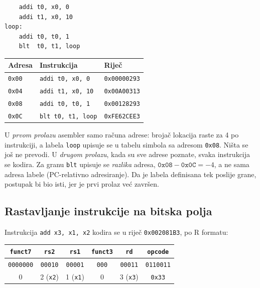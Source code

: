\documentclass[11pt,a4paper]{article}
\newcommand{\kod}[1]{\texttt{#1}}
\begin{document}
\begin{center}
\begin{minipage}[t]{0.3\textwidth}
\small
\begin{verbatim}
    addi t0, x0, 0
    addi t1, x0, 10
loop:
    addi t0, t0, 1
    blt  t0, t1, loop
\end{verbatim}
\end{minipage}%
\hfill
\begin{minipage}[t]{0.66\textwidth}
\small
\begin{tabular}{@{}lll@{}}
  \toprule
  \textbf{Adresa} & \textbf{Instrukcija} & \textbf{Riječ} \\
  \midrule
  \kod{0x00} & \kod{addi t0, x0, 0}   & \kod{0x00000293} \\
  \kod{0x04} & \kod{addi t1, x0, 10}  & \kod{0x00A00313} \\
  \kod{0x08} & \kod{addi t0, t0, 1}   & \kod{0x00128293} \\
  \kod{0x0C} & \kod{blt t0, t1, loop} & \kod{0xFE62CEE3} \\
  \bottomrule
\end{tabular}
\end{minipage}
\end{center}

U \emph{prvom prolazu} asembler samo računa adrese: brojač lokacija raste za 4 po instrukciji, a
labela \kod{loop} upisuje se u tabelu simbola sa adresom \kod{0x08}. Ništa se još ne prevodi.
U \emph{drugom prolazu}, kada su sve adrese poznate, svaka instrukcija se kodira. Za granu
\kod{blt} upisuje se \emph{razlika} adresa, $\kod{0x08} - \kod{0x0C} = -4$, a ne sama adresa
labele (PC-relativno adresiranje). Da je labela definisana tek poslije grane, postupak bi bio isti,
jer je prvi prolaz već završen.

\subsection{Rastavljanje instrukcije na bitska polja}

Instrukcija \kod{add x3, x1, x2} kodira se u riječ \kod{0x002081B3}, po R formatu:

\begin{center}
\small
\begin{tabular}{@{}cccccc@{}}
  \toprule
  \kod{funct7} & \kod{rs2} & \kod{rs1} & \kod{funct3} & \kod{rd} & \kod{opcode} \\
  \midrule
  \kod{0000000} & \kod{00010} & \kod{00001} & \kod{000} & \kod{00011} & \kod{0110011} \\
  0 & 2 (\kod{x2}) & 1 (\kod{x1}) & 0 & 3 (\kod{x3}) & \kod{0x33} \\
  \bottomrule
\end{tabular}
\end{center}
\end{document}
